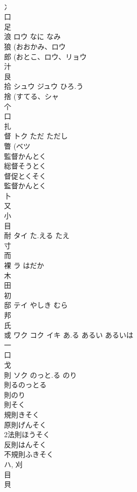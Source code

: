\documentclass[8pt]{extreport}
\begin{document}
\begin{CJK}{UTF8}{min}
\\	冫 
\\	口 
\\	足 
\\	浪	ロウ	なに なみ	
\\	狼 (おおかみ、ロウ 
\\	郎 (おとこ、ロウ、リョウ 
\\	汁 
\\	艮 
\\	拾	シュウ ジュウ	ひろ.う	
\\	捨 (すてる、シャ 
\\	个 
\\	口 
\\	扎	
\\	督	トク	ただ ただし	
\\	瞥 (ベツ 
\\	監督かんとく
\\	総督そうとく
\\	督促とくそく
\\	監督かんとく
\\	卜 
\\	又 
\\	小 
\\	目 
\\	耐	タイ	た.える たえ	
\\	寸 
\\	而 
\\	裸	ラ	はだか	
\\	木 
\\	田 
\\	初 
\\	邸	テイ	やしき むら	
\\	邦 
\\	氏 
\\	或	ワク コク イキ	あ.る あるい あるいは	
\\	一 
\\	口 
\\	戈 
\\	則	ソク	のっと.る のり	
\\	則るのっとる
\\	則のり
\\	則そく
\\	規則きそく
\\	原則げんそく
\\	2法則ほうそく
\\	反則はんそく
\\	不規則ふきそく
\\	ハ, 刈 
\\	目 
\\	貝 

\end{CJK}
\end{document}
